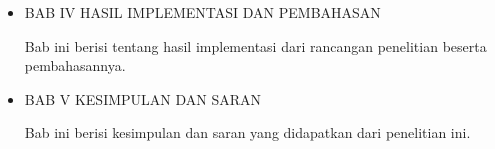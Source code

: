 \begin{flushleft}
\begin{itemize}
\begin{justify}
  \end{justify}
\end{itemize}


\begin{itemize}
  \item \noindent BAB IV HASIL IMPLEMENTASI DAN PEMBAHASAN
  \begin{justify}
    Bab ini berisi tentang hasil implementasi dari rancangan penelitian beserta pembahasannya.

  \end{justify}
\end{itemize}


\begin{itemize}
  \item \noindent BAB V KESIMPULAN DAN SARAN
  \begin{justify}
    Bab ini berisi kesimpulan dan saran yang didapatkan dari penelitian ini.

  \end{justify}
\end{itemize}



\end{flushleft}



\newpage
